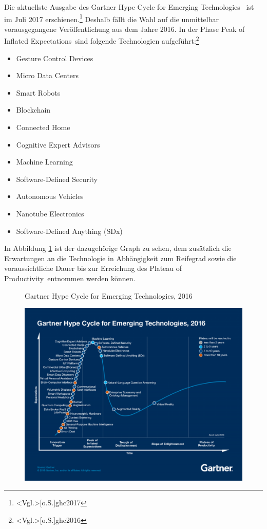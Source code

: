 Die aktuellste Ausgabe des \glqq Gartner Hype Cycle for Emerging Technologies\grqq~ ist im Juli 2017 erschienen.\footnote{\citeNP<Vgl.>[o.S.]{ghc2017}} Deshalb fällt die Wahl auf die unmittelbar vorausgegangene Veröffentlichung aus dem Jahre 2016. In der Phase \glqq Peak of Inflated Expectations\grqq~sind folgende Technologien aufgeführt:\footnote{\citeNP<Vgl.>[o.S.]{ghc2016}}

\begin{itemize}
	\item Gesture Control Devices
	\item Micro Data Centers
	\item Smart Robots
	\item Blockchain
	\item Connected Home
	\item Cognitive Expert Advisors
	\item Machine Learning
	\item Software-Defined Security
	\item Autonomous Vehicles
	\item Nanotube Electronics
	\item Software-Defined Anything (SDx)
\end{itemize}

In Abbildung \ref{fig:ghc2016} ist der dazugehörige Graph zu sehen, dem zusätzlich die Erwartungen an die Technologie in Abhängigkeit zum Reifegrad sowie die voraussichtliche Dauer bis zur Erreichung des \glqq Plateau of Productivity\grqq~entnommen werden können.

\begin{figure}[ht]
	\centering
	\caption{Gartner Hype Cycle for Emerging Technologies, 2016}
	\includegraphics[width=0.9\linewidth]{img/Hype_Cycle_2016.jpg}
	\caption*{\protect\citeNP<Quelle:>[o.S.]{ghcet2016}}
	\label{fig:ghc2016}
\end{figure}

